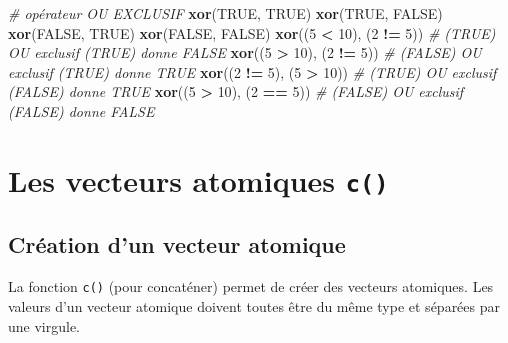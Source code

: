 \documentclass[
]{book}
\newenvironment{Shaded}{\begin{snugshade}}{\end{snugshade}}
\newcommand{\CommentTok}[1]{\textcolor[rgb]{0.56,0.35,0.01}{\textit{#1}}}
\newcommand{\ConstantTok}[1]{\textcolor[rgb]{0.56,0.35,0.01}{#1}}
\newcommand{\DecValTok}[1]{\textcolor[rgb]{0.00,0.00,0.81}{#1}}
\newcommand{\FunctionTok}[1]{\textcolor[rgb]{0.13,0.29,0.53}{\textbf{#1}}}
\newcommand{\NormalTok}[1]{#1}
\newcommand{\SpecialCharTok}[1]{\textcolor[rgb]{0.81,0.36,0.00}{\textbf{#1}}}
\begin{document}
\begin{Shaded}
\begin{Highlighting}[]
\CommentTok{\# opérateur OU EXCLUSIF}
\FunctionTok{xor}\NormalTok{(}\ConstantTok{TRUE}\NormalTok{, }\ConstantTok{TRUE}\NormalTok{)}
\FunctionTok{xor}\NormalTok{(}\ConstantTok{TRUE}\NormalTok{, }\ConstantTok{FALSE}\NormalTok{)}
\FunctionTok{xor}\NormalTok{(}\ConstantTok{FALSE}\NormalTok{, }\ConstantTok{TRUE}\NormalTok{)}
\FunctionTok{xor}\NormalTok{(}\ConstantTok{FALSE}\NormalTok{, }\ConstantTok{FALSE}\NormalTok{)}
\FunctionTok{xor}\NormalTok{((}\DecValTok{5} \SpecialCharTok{\textless{}} \DecValTok{10}\NormalTok{), (}\DecValTok{2} \SpecialCharTok{!=} \DecValTok{5}\NormalTok{)) }\CommentTok{\# (TRUE) OU exclusif (TRUE) donne FALSE}
\FunctionTok{xor}\NormalTok{((}\DecValTok{5} \SpecialCharTok{\textgreater{}} \DecValTok{10}\NormalTok{), (}\DecValTok{2} \SpecialCharTok{!=} \DecValTok{5}\NormalTok{)) }\CommentTok{\# (FALSE) OU exclusif (TRUE) donne TRUE}
\FunctionTok{xor}\NormalTok{((}\DecValTok{2} \SpecialCharTok{!=} \DecValTok{5}\NormalTok{), (}\DecValTok{5} \SpecialCharTok{\textgreater{}} \DecValTok{10}\NormalTok{)) }\CommentTok{\# (TRUE) OU exclusif (FALSE) donne TRUE}
\FunctionTok{xor}\NormalTok{((}\DecValTok{5} \SpecialCharTok{\textgreater{}} \DecValTok{10}\NormalTok{), (}\DecValTok{2} \SpecialCharTok{==} \DecValTok{5}\NormalTok{)) }\CommentTok{\# (FALSE) OU exclusif (FALSE) donne FALSE}
\end{Highlighting}
\end{Shaded}

\section{\texorpdfstring{Les vecteurs atomiques \texttt{c()}}{Les vecteurs atomiques c()}}\label{les-vecteurs-atomiques-c}

\subsection{Création d'un vecteur atomique}\label{cruxe9ation-dun-vecteur-atomique}

La fonction \texttt{c()} (pour concaténer) permet de créer des vecteurs atomiques.
Les valeurs d'un vecteur atomique doivent toutes être du même type et séparées par une virgule.
\end{document}
